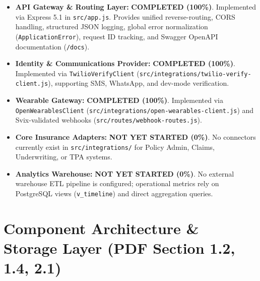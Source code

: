 \documentclass[11pt,a4paper]{article}
\begin{document}
\begin{itemize}[leftmargin=1.5em]
    \item \textbf{API Gateway \& Routing Layer:} \textcolor{statuscompleted}{\textbf{COMPLETED (100\%)}}. Implemented via Express 5.1 in \texttt{src/app.js}. Provides unified reverse-routing, CORS handling, structured JSON logging, global error normalization (\texttt{ApplicationError}), request ID tracking, and Swagger OpenAPI documentation (\texttt{/docs}).
    \item \textbf{Identity \& Communications Provider:} \textcolor{statuscompleted}{\textbf{COMPLETED (100\%)}}. Implemented via \texttt{TwilioVerifyClient} (\texttt{src/integrations/twilio-verify-client.js}), supporting SMS, WhatsApp, and dev-mode verification.
    \item \textbf{Wearable Gateway:} \textcolor{statuscompleted}{\textbf{COMPLETED (100\%)}}. Implemented via \texttt{OpenWearablesClient} (\texttt{src/integrations/open-wearables-client.js}) and Svix-validated webhooks (\texttt{src/routes/webhook-routes.js}).
    \item \textbf{Core Insurance Adapters:} \textcolor{statusnotstarted}{\textbf{NOT YET STARTED (0\%)}}. No connectors currently exist in \texttt{src/integrations/} for Policy Admin, Claims, Underwriting, or TPA systems.
    \item \textbf{Analytics Warehouse:} \textcolor{statusnotstarted}{\textbf{NOT YET STARTED (0\%)}}. No external warehouse ETL pipeline is configured; operational metrics rely on PostgreSQL views (\texttt{v\_timeline}) and direct aggregation queries.
\end{itemize}

\newpage

\section{Component Architecture \& Storage Layer (PDF Section 1.2, 1.4, 2.1)}
\end{document}
